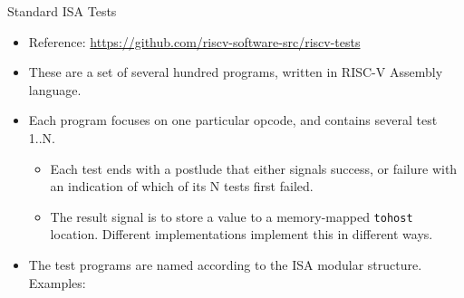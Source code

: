 \documentclass{article}
\begin{document}
\clearpage


\begin{center}
  {\Huge
    Standard ISA Tests}

  \vspace*{0.2in}

  \begin{minipage}{9in}\Large
    \begin{itemize}
    \item Reference: \url{https://github.com/riscv-software-src/riscv-tests}
    \item These are a set of several hundred programs, written in RISC-V Assembly language.
    \item Each program focuses on one particular opcode, and contains several test 1..N.
      \begin{itemize}
        \item Each test ends with a postlude that either signals
          success, or failure with an indication of which of its N tests first failed.

        \item The result signal is to store a value to a memory-mapped
          {\tt tohost} location.  Different implementations implement
          this in different ways.
      \end{itemize}
    \item The test programs are named according to the ISA modular structure. Examples:
    \end{itemize}

  \end{minipage}

  \vspace {0.1in}

\end{center}
\end{document}
